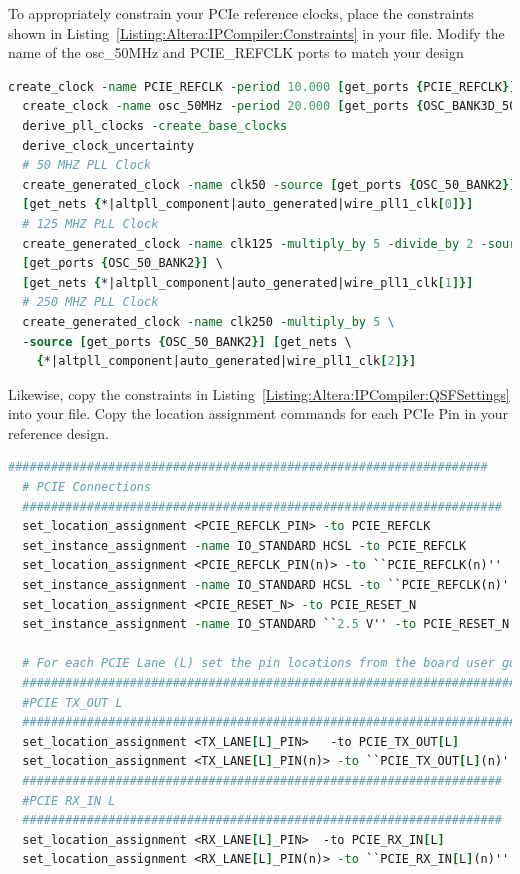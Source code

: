\documentclass{refrep}
\newcommand{\Altera}[1]{{\color{blue}{#1}}}
\begin{document}
To appropriately constrain your PCIe reference clocks, place the constraints
shown in Listing~\ref{Listing:Altera:IPCompiler:Constraints} in your
\Altera{.sdc} file. Modify the name of the osc\_50MHz and PCIE\_REFCLK ports to
match your design
\begin{lstlisting}[language=tcl,basicstyle=\footnotesize\ttfamily,commentstyle=\color{red},
    label=Listing:Altera:IPCompiler:Constraints,
    caption=\Altera{.sdc} constraints for Qsys and Megawizard designs,frame=single]
  create_clock -name PCIE_REFCLK -period 10.000 [get_ports {PCIE_REFCLK}]
  create_clock -name osc_50MHz -period 20.000 [get_ports {OSC_BANK3D_50MHZ}]
  derive_pll_clocks -create_base_clocks
  derive_clock_uncertainty
  # 50 MHZ PLL Clock
  create_generated_clock -name clk50 -source [get_ports {OSC_50_BANK2}] \
  [get_nets {*|altpll_component|auto_generated|wire_pll1_clk[0]}]
  # 125 MHZ PLL Clock
  create_generated_clock -name clk125 -multiply_by 5 -divide_by 2 -source \
  [get_ports {OSC_50_BANK2}] \
  [get_nets {*|altpll_component|auto_generated|wire_pll1_clk[1]}]
  # 250 MHZ PLL Clock
  create_generated_clock -name clk250 -multiply_by 5 \ 
  -source [get_ports {OSC_50_BANK2}] [get_nets \
    {*|altpll_component|auto_generated|wire_pll1_clk[2]}]
\end{lstlisting}

Likewise, copy the constraints in
Listing~\ref{Listing:Altera:IPCompiler:QSFSettings} into your \Altera{.qsf}
file. Copy the location assignment commands for each PCIe Pin in your reference
design.
\begin{lstlisting}[language=tcl,basicstyle=\footnotesize\ttfamily,
    commentstyle=\color{red},label=Listing:Altera:IPCompiler:QSFSettings,
    caption=\Altera{.qsf} settings for IP Compiler Designs,frame=single]
  ###################################################################
  # PCIE Connections
  ###################################################################
  set_location_assignment <PCIE_REFCLK_PIN> -to PCIE_REFCLK
  set_instance_assignment -name IO_STANDARD HCSL -to PCIE_REFCLK
  set_location_assignment <PCIE_REFCLK_PIN(n)> -to ``PCIE_REFCLK(n)''
  set_instance_assignment -name IO_STANDARD HCSL -to ``PCIE_REFCLK(n)''
  set_location_assignment <PCIE_RESET_N> -to PCIE_RESET_N
  set_instance_assignment -name IO_STANDARD ``2.5 V'' -to PCIE_RESET_N

  # For each PCIE Lane (L) set the pin locations from the board user guide!
  ######################################################################
  #PCIE TX_OUT L
  ######################################################################
  set_location_assignment <TX_LANE[L]_PIN>   -to PCIE_TX_OUT[L]
  set_location_assignment <TX_LANE[L]_PIN(n)> -to ``PCIE_TX_OUT[L](n)''
  ###################################################################
  #PCIE RX_IN L
  ###################################################################
  set_location_assignment <RX_LANE[L]_PIN>  -to PCIE_RX_IN[L]
  set_location_assignment <RX_LANE[L]_PIN(n)> -to ``PCIE_RX_IN[L](n)''
\end{lstlisting}
\pagebreak
\end{document}
